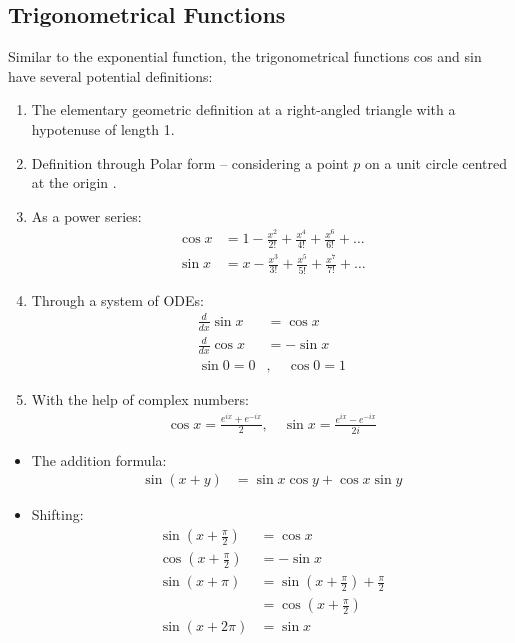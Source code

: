 \subsection{Trigonometrical Functions}
\begin{df}
Similar to the exponential function, the trigonometrical functions cos and sin have several potential definitions:
\begin{enumerate}
\item
The elementary geometric definition at a right-angled triangle with a hypotenuse of length 1. 
\item
Definition through Polar form -- considering a point $p$ on a unit circle centred at the origin .
\item
As a power series:
\begin{align*}
\cos x & = 1- \frac{x^2}{2!} + \frac{x^4}{4!} + \frac{x^6}{6!} +\dots \\
\sin x & = x- \frac{x^3}{3!} + \frac{x^5}{5!} + \frac{x^7}{7!} +\dots
\end{align*}
\item
Through a system of ODEs:
\begin{align*}
\frac{d}{dx} \sin x & = \cos x \\
\frac{d}{dx} \cos x & = -\sin x \\
\sin 0 = 0&,  \quad \cos 0 =1
\end{align*}
\item
With the help of complex numbers:
\begin{align*}
\cos x = \frac{e^{ix}+e^{-ix}}{2}, \quad \sin x = \frac{e^{ix}-e^{-ix}}{2i}
\end{align*}
\end{enumerate} 
\end{df}
\begin{pr} \mbox \\
\begin{itemize}
\item
The addition formula:
\begin{align*}
\sin \left( x+y \right) & = \sin x \cos y + \cos x \sin y
\end{align*}
\item
 Shifting:
\begin{align*}
\sin\left( x+\frac{\pi}{2}\right) & = \cos x \\
\cos\left( x+\frac \pi 2\right) & = -\sin x \\
\sin\left( x+ \pi \right) & = \sin\left( x+ \frac \pi 2\right)+\frac \pi 2\\ 
 & = \cos\left( x+\frac \pi 2 \right) \\
 \sin \left( x+2\pi\right) & = \sin x
\end{align*}
\end{itemize}

\end{pr}
